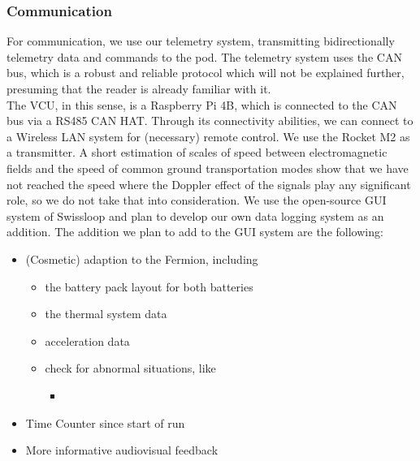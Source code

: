 \subsubsection*{Communication}
For communication, we use our telemetry system, transmitting bidirectionally telemetry data and commands to the pod. The telemetry system uses the CAN bus, which is a robust and reliable protocol which will not be explained further, presuming that the reader is already familiar with it. \\
The VCU, in this sense, is a Raspberry Pi 4B, which is connected to the CAN bus via a RS485 CAN HAT. 
Through its connectivity abilities, we can connect to a Wireless LAN system for (necessary) remote control. We use the Rocket M2 as a transmitter. A short estimation of scales of speed between electromagnetic fields and the speed of common ground transportation modes show that we have not reached the speed where the Doppler effect of the signals play any significant role, so we do not take that into consideration. We use the open-source GUI system of Swissloop and plan to develop our own data logging system as an addition. The addition we plan to add to the GUI system are the following:
\begin{itemize}
    \item (Cosmetic) adaption to the Fermion, including \begin{itemize}
        \item the battery pack layout for both batteries
        \item the thermal system data
        \item acceleration data
        \item check for abnormal situations, like \begin{itemize}
            \item 
        \end{itemize}
    \end{itemize}
    \item Time Counter since start of run
    \item More informative audiovisual feedback
\end{itemize} 

